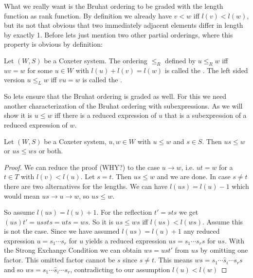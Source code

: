 What we really want is the Bruhat ordering to be graded with the length function as rank function. By definition we already have $v < w$ iff $l(v) < l(w)$, but its not that obvious that two immediately adjacent elements differ in length by exactly 1. Before lets just mention two other partial orderings, where this property is obvious by definition:

\begin{defi}
	Let $(W,S)$ be a Coxeter system. The ordering $\leq_R$ defined by $u \leq_R w$ iff $uv = w$ for some $u \in W$ with $l(u) + l(v) = l(w)$ is called the . The left sided version $u \leq_L w$ iff $vu = w$ is called the .
\end{defi}

So lets ensure that the Bruhat ordering is graded as well. For this we need another characterization of the Bruhat ordering with subexpressions. As we will show it is $u \leq w$ iff there is a reduced expression of $u$ that is a subexpression of a reduced expression of $w$.

\begin{prop}
	Let $(W,S)$ be a Coxeter system, $u,w \in W$ with $u \leq w$ and $s \in S$. Then $us \leq w$ or $us \leq ws$ or both.

	\begin{proof}
		We can reduce the proof (WHY?) to the case $u \to w$, i.e. $ut = w$ for a $t \in T$ with $l(v) < l(u)$. Let $s = t$. Then $us \leq w$ and we are done. In case $s \neq t$ there are two alternatives for the lengths. We can have $l(us) = l(u) - 1$ which would mean $us \to u \to w$, so $us \leq w$.

		So assume $l(us) = l(u) + 1$. For the reflection $t' = sts$ we get $(us)t' = ussts = uts = ws$. So it is $us \leq ws$ iff $l(us) < l(ws)$. Assume this is not the case. Since we have assumed $l(us) = l(u) + 1$ any reduced expression $u = s_1 \cdots s_r$ for $u$ yields a reduced expression $us = s_1 \cdots s_r s$ for $us$. With the Strong Exchange Condition we can obtain $ws = ust'$ from $us$ by omitting one factor. This omitted factor cannot be $s$ since $s \neq t$. This means $ws = s_1 \cdots \hat s_i \cdots s_r s$ and so $ws = s_1 \cdots \hat s_i \cdots s_r$, contradicting to our assumption $l(u) < l(w)$
	\end{proof}
\end{prop}